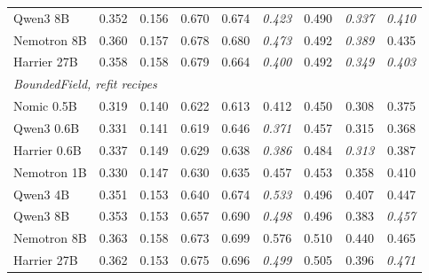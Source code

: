 \begin{table}[H]
\begin{tabular}{lrrrrrrrr}
Qwen3 8B & 0.352 & 0.156 & 0.670 & 0.674 & \textit{0.423} & 0.490 & \textit{0.337} & \textit{0.410} \\
Nemotron 8B & 0.360 & 0.157 & 0.678 & 0.680 & \textit{0.473} & 0.492 & \textit{0.389} & 0.435 \\
Harrier 27B & 0.358 & 0.158 & 0.679 & 0.664 & \textit{0.400} & 0.492 & \textit{0.349} & \textit{0.403} \\
\midrule
\multicolumn{9}{l}{\textit{BoundedField, refit recipes}} \\
Nomic 0.5B & 0.319 & 0.140 & 0.622 & 0.613 & 0.412 & 0.450 & 0.308 & 0.375 \\
Qwen3 0.6B & 0.331 & 0.141 & 0.619 & 0.646 & \textit{0.371} & 0.457 & 0.315 & 0.368 \\
Harrier 0.6B & 0.337 & 0.149 & 0.629 & 0.638 & \textit{0.386} & 0.484 & \textit{0.313} & 0.387 \\
Nemotron 1B & 0.330 & 0.147 & 0.630 & 0.635 & 0.457 & 0.453 & 0.358 & 0.410 \\
Qwen3 4B & 0.351 & 0.153 & 0.640 & 0.674 & \textit{0.533} & 0.496 & 0.407 & 0.447 \\
Qwen3 8B & 0.353 & 0.153 & 0.657 & 0.690 & \textit{0.498} & 0.496 & 0.383 & \textit{0.457} \\
Nemotron 8B & 0.363 & 0.158 & 0.673 & 0.699 & 0.576 & 0.510 & 0.440 & 0.465 \\
Harrier 27B & 0.362 & 0.153 & 0.675 & 0.696 & \textit{0.499} & 0.505 & 0.396 & \textit{0.471} \\
\bottomrule
\end{tabular}
\end{table}
